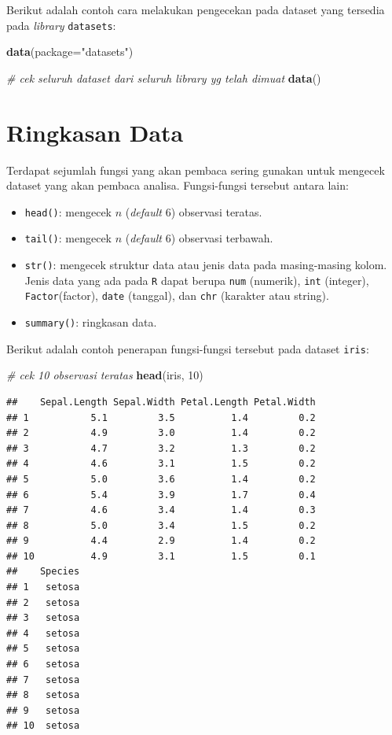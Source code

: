 \documentclass[]{book}
\newenvironment{Shaded}{\begin{snugshade}}{\end{snugshade}}
\newcommand{\CommentTok}[1]{\textcolor[rgb]{0.56,0.35,0.01}{\textit{#1}}}
\newcommand{\DataTypeTok}[1]{\textcolor[rgb]{0.13,0.29,0.53}{#1}}
\newcommand{\DecValTok}[1]{\textcolor[rgb]{0.00,0.00,0.81}{#1}}
\newcommand{\KeywordTok}[1]{\textcolor[rgb]{0.13,0.29,0.53}{\textbf{#1}}}
\newcommand{\NormalTok}[1]{#1}
\newcommand{\StringTok}[1]{\textcolor[rgb]{0.31,0.60,0.02}{#1}}
\providecommand{\tightlist}{%
  \setlength{\itemsep}{0pt}\setlength{\parskip}{0pt}}
\theoremstyle{definition}
\theoremstyle{definition}
\theoremstyle{definition}
\theoremstyle{remark}
\begin{document}
Berikut adalah contoh cara melakukan pengecekan pada dataset yang tersedia pada \emph{library} \texttt{datasets}:

\begin{Shaded}
\begin{Highlighting}[]
\KeywordTok{data}\NormalTok{(}\DataTypeTok{package=}\StringTok{"datasets"}\NormalTok{)}

\CommentTok{# cek seluruh dataset dari seluruh library yg telah dimuat}
\KeywordTok{data}\NormalTok{()}
\end{Highlighting}
\end{Shaded}

\hypertarget{summarystats}{%
\section{Ringkasan Data}\label{summarystats}}

Terdapat sejumlah fungsi yang akan pembaca sering gunakan untuk mengecek dataset yang akan pembaca analisa. Fungsi-fungsi tersebut antara lain:

\begin{itemize}
\tightlist
\item
  \texttt{head()}: mengecek \(n\) (\emph{default} 6) observasi teratas.
\item
  \texttt{tail()}: mengecek \(n\) (\emph{default} 6) observasi terbawah.
\item
  \texttt{str()}: mengecek struktur data atau jenis data pada masing-masing kolom. Jenis data yang ada pada \texttt{R} dapat berupa \texttt{num} (numerik), \texttt{int} (integer), \texttt{Factor}(factor), \texttt{date} (tanggal), dan \texttt{chr} (karakter atau string).
\item
  \texttt{summary()}: ringkasan data.
\end{itemize}

Berikut adalah contoh penerapan fungsi-fungsi tersebut pada dataset \texttt{iris}:

\begin{Shaded}
\begin{Highlighting}[]
\CommentTok{# cek 10 observasi teratas}
\KeywordTok{head}\NormalTok{(iris, }\DecValTok{10}\NormalTok{)}
\end{Highlighting}
\end{Shaded}

\begin{verbatim}
##    Sepal.Length Sepal.Width Petal.Length Petal.Width
## 1           5.1         3.5          1.4         0.2
## 2           4.9         3.0          1.4         0.2
## 3           4.7         3.2          1.3         0.2
## 4           4.6         3.1          1.5         0.2
## 5           5.0         3.6          1.4         0.2
## 6           5.4         3.9          1.7         0.4
## 7           4.6         3.4          1.4         0.3
## 8           5.0         3.4          1.5         0.2
## 9           4.4         2.9          1.4         0.2
## 10          4.9         3.1          1.5         0.1
##    Species
## 1   setosa
## 2   setosa
## 3   setosa
## 4   setosa
## 5   setosa
## 6   setosa
## 7   setosa
## 8   setosa
## 9   setosa
## 10  setosa
\end{verbatim}
\end{document}
